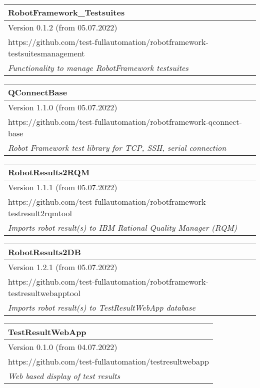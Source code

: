 \begin{center}
\begin{tabular}{| m{44em} |}\hline
   \textbf{RobotFramework\_Testsuites}\\ \hline
   Version 0.1.2 (from 05.07.2022)\\ \hline
   https://github.com/test-fullautomation/robotframework-testsuitesmanagement\\ \hline
   \textit{Functionality to manage RobotFramework testsuites}\\ \hline
\end{tabular}

\vspace{2ex}

\begin{tabular}{| m{44em} |}\hline
   \textbf{QConnectBase}\\ \hline
   Version 1.1.0 (from 05.07.2022)\\ \hline
   https://github.com/test-fullautomation/robotframework-qconnect-base\\ \hline
   \textit{Robot Framework test library for TCP, SSH, serial connection}\\ \hline
\end{tabular}

\vspace{2ex}

\begin{tabular}{| m{44em} |}\hline
   \textbf{RobotResults2RQM}\\ \hline
   Version 1.1.1 (from 05.07.2022)\\ \hline
   https://github.com/test-fullautomation/robotframework-testresult2rqmtool\\ \hline
   \textit{Imports robot result(s) to IBM Rational Quality Manager (RQM)}\\ \hline
\end{tabular}

\vspace{2ex}

\begin{tabular}{| m{44em} |}\hline
   \textbf{RobotResults2DB}\\ \hline
   Version 1.2.1 (from 05.07.2022)\\ \hline
   https://github.com/test-fullautomation/robotframework-testresultwebapptool\\ \hline
   \textit{Imports robot result(s) to TestResultWebApp database}\\ \hline
\end{tabular}

\vspace{2ex}

\begin{tabular}{| m{44em} |}\hline
   \textbf{TestResultWebApp}\\ \hline
   Version 0.1.0 (from 04.07.2022)\\ \hline
   https://github.com/test-fullautomation/testresultwebapp\\ \hline
   \textit{Web based display of test results}\\ \hline
\end{tabular}

\vspace{2ex}

\end{center}

